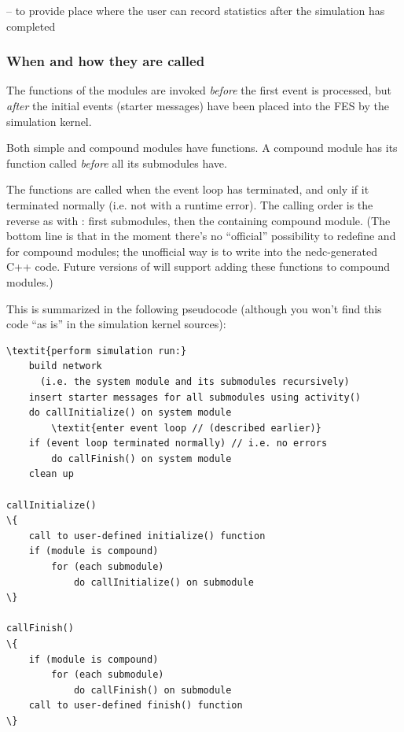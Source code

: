 -- to provide place where the user can record statistics
after the simulation has completed


\subsubsection{When and how they are called}


The  functions of the modules are invoked
\textit{before} the first event is processed, but \textit{after} the
initial events (starter messages) have been
placed into the FES by the simulation kernel.


Both simple and compound modules have  functions.
A compound module has its  function called
\textit{before} all its submodules have.


The  functions are called when the event
loop has terminated, and only if it terminated
normally (i.e. not with a runtime error).  The calling order is the
reverse as with : first submodules, then the
containing compound module. (The bottom line is that in the moment
there's no ``official'' possibility to redefine 
and  for compound modules; the unofficial way is to
write into the nedc-generated C++ code. Future versions of {\opp} will
support adding these functions to compound
modules.)

This is summarized in the following pseudocode (although you
won't find this code ``as is'' in the simulation
kernel sources):


\begin{Verbatim}[commandchars=\\\{\}]
\textit{perform simulation run:}
    build network
      (i.e. the system module and its submodules recursively)
    insert starter messages for all submodules using activity()
    do callInitialize() on system module
        \textit{enter event loop // (described earlier)}
    if (event loop terminated normally) // i.e. no errors
        do callFinish() on system module
    clean up

callInitialize()
\{
    call to user-defined initialize() function
    if (module is compound)
        for (each submodule)
            do callInitialize() on submodule
\}

callFinish()
\{
    if (module is compound)
        for (each submodule)
            do callFinish() on submodule
    call to user-defined finish() function
\}
\end{Verbatim}



